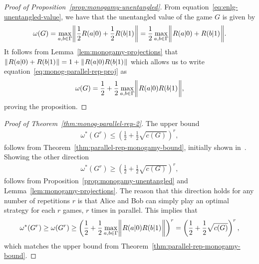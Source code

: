 %

\begin{proof}[Proof of Proposition~\ref{prop:monogamy-unentangled}]
	From equation~\eqref{eq:enlg-unentangled-value}, we have that the unentangled value of the game $G$ is given by 
	\begin{align} \label{eq:monog-parallel-rep-proj}
		\omega(G) = \max_{a,b \in \Gamma} \biggl\lVert\mspace{1mu} \frac{1}{2} R(a|0) + \frac{1}{2} R(b|1)  \mspace{1mu}\biggr\rVert = \frac{1}{2} \max_{a,b \in \Gamma} \biggl\lVert\mspace{1mu} R(a|0) + R(b|1) \mspace{1mu}\biggr\rVert.
	\end{align}
	It follows from Lemma~\ref{lem:monogamy-projections} that $\lVert\mspace{1mu} R(a|0) + R(b|1) \mspace{1mu}\rVert = 1 + \lVert\mspace{1mu} R(a|0) R(b|1) \mspace{1mu}\rVert$ which allows us to write equation~\eqref{eq:monog-parallel-rep-proj} as 
	\begin{align}
		\omega(G) = \frac{1}{2} + \frac{1}{2} \max_{a,b \in \Gamma} \biggl\lVert\mspace{1mu} R(a|0)R(b|1) \mspace{1mu}\biggr\rVert,
	\end{align}
	proving the proposition. 
\end{proof}

\begin{proof}[Proof of Theorem~\ref{thm:monog-parallel-rep-2}]
	The upper bound
		\begin{align}
			\omega^*(G^r) \leq \left(\frac{1}{2} + \frac{1}{2} \sqrt{c(G)} \right)^r,
	\end{align}
	follows from Theorem~\ref{thm:parallel-rep-monogamy-bound}, initially shown in~\cite{Tomamichel2013}. 
	Showing the other direction
		\begin{align}
	\omega^*(G^r) \geq \left(\frac{1}{2} + \frac{1}{2} \sqrt{c(G)} \right)^r,
\end{align}
 follows from Proposition~\ref{prop:monogamy-unentangled} and Lemma~\ref{lem:monogamy-projections}. The reason that this direction holds for any number of repetitions $r$ is that Alice and Bob can simply play an optimal strategy for each $r$ games, $r$ times in parallel. This implies that 
 \begin{align}
 	\omega^*(G^r) \geq \omega(G^r) \geq \left( \frac{1}{2} + \frac{1}{2} \max_{a,b \in \Gamma} \biggl\lVert\mspace{1mu} R(a|0)R(b|1) \mspace{1mu}\biggr\rVert \right)^r = \left( \frac{1}{2} + \frac{1}{2} \sqrt{c(G)} \right)^r,
 \end{align}
 which matches the upper bound from Theorem~\ref{thm:parallel-rep-monogamy-bound}.
\end{proof}


